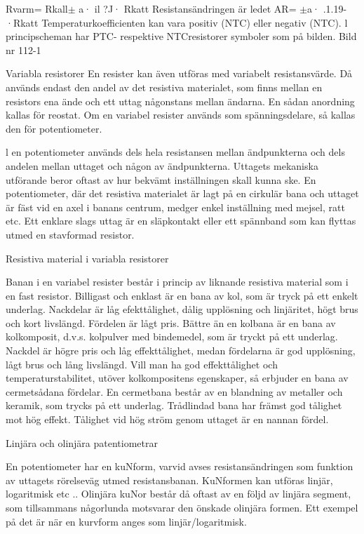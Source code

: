 \documentclass[a4paper,twoside,twocolumn,openright]{book}
\begin{document}
{{Rvarm= Rkall$\pm$ a· il ?J· Rkatt
Resistansändringen är ledet
AR= $\pm$a· .1.19- ·Rkatt
Temperaturkoefficienten kan vara positiv (NTC) eller negativ (NTC).
l principscheman har PTC- respektive NTCresistorer symboler som på bilden.
Bild nr 112-1

Variabla resistorer
En resister kan även utföras med variabelt
resistansvärde. Då används endast den andel av det resistiva materialet, som finns
mellan en resistors ena ände och ett uttag
någonstans mellan ändarna. En sådan anordning kallas för reostat. Om en variabel
resister används som spänningsdelare, så
kallas den för potentiometer.

l en potentiometer används dels hela
resistansen mellan ändpunkterna och dels
andelen mellan uttaget och någon av
ändpunkterna.
Uttagets mekaniska utförande beror oftast av hur bekvämt inställningen skall kunna
ske. En potentiometer, där det resistiva
materialet är lagt på en cirkulär bana och
uttaget är fäst vid en axel i banans centrum,
medger enkel inställning med mejsel, ratt
etc. Ett enklare slags uttag är en släpkontakt
eller ett spännband som kan flyttas utmed en
stavformad resistor.

Resistiva material i variabla resistorer

Banan i en variabel resister består i princip
av liknande resistiva material som i en fast
resistor.
Billigast och enklast är en bana av kol,
som är tryck på ett enkelt underlag. Nackdelar är låg efekttålighet, dålig upplösning och
linjäritet, högt brus och kort livslängd. Fördelen är lågt pris.
Bättre än en kolbana är en bana av kolkomposit, d.v.s. kolpulver med bindemedel,
som är tryckt på ett underlag. Nackdel är
högre pris och låg effekttålighet, medan fördelarna är god upplösning, lågt brus och
lång livslängd.
Vill man ha god effekttålighet och temperaturstabilitet, utöver kolkompositens egenskaper, så erbjuder en bana av cermetsådana fördelar. En cermetbana består av en
blandning av metaller och keramik, som
trycks på ett underlag.
Trådlindad bana har främst god tålighet
mot hög effekt. Tålighet vid hög ström genom uttaget är en nannan fördel.

Linjära och olinjära patentiometrar

En potentiometer har en kuNform, varvid
avses resistansändringen som funktion av
uttagets rörelseväg utmed resistansbanan.
KuNformen kan utföras linjär, logaritmisk
etc .. Olinjära kuNor består då oftast av en
följd av linjära segment, som tillsammans
någorlunda motsvarar den önskade olinjära
formen. Ett exempel på det är när en kurvform
anges som linjär/logaritmisk.

}}
\end{document}
